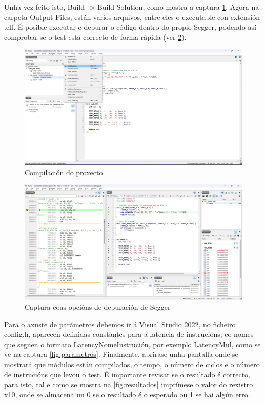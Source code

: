  Unha vez feito isto,  Build -> Build Solution, como mostra a captura \ref{fig:compilar}. Agora na carpeta Output Files, están varios arquivos, entre eles o executable con extensión .elf. É posible executar e depurar o código dentro do propio Segger, podendo así comprobar se o test está correcto de forma rápida (ver \ref{fig:cap3}).

\begin{figure}[hp!]
  \centering
  \includegraphics[width=\textwidth]{imaxes/Cap_3_Comp.png}
  \caption{Compilación do proxecto}
  \label{fig:compilar}
\end{figure}

\begin{figure}[hp!]
  \centering
  \includegraphics[width=\textwidth]{imaxes/Cap_4_Debug.png}
  \caption{Captura coas opcións de depuración de Segger}
  \label{fig:cap3}
\end{figure}

Para o axuste de parámetros debemos ir á Visual Studio 2022, no ficheiro config.h, aparecen definidas constantes para a latencia de instrucións, co nomes que seguen o formato LatencyNomeInstrución, por exemplo LatencyMul, como se ve na captura \ref{fig:parametros}. Finalmente, abrirase unha pantalla onde se mostrará que módulos están compilados, o tempo, o número de ciclos e o número de instrucións que levou o test. É importante revisar se o resultado é correcto, para isto, tal e como se mostra na \ref{fig:resultados} imprímese o valor do rexistro x10, onde se almacena un 0 se o resultado é o esperado ou 1 se hai algún erro.

